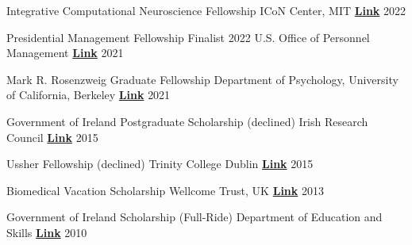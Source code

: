 

\begin{cvhonors}

 \cvhonor
    {Integrative Computational Neuroscience Fellowship} %
    {ICoN Center, MIT}
    {\href{https://yangtan.mit.edu/supported-researchers/}{\textbf{Link}}}
  	{2022}

 \cvhonor
    {Presidential Management Fellowship Finalist 2022} %
    {U.S. Office of Personnel Management}
    {\href{https://apply.pmf.gov/finalists.aspx}{\textbf{Link}}}
  	{2021}

 \cvhonor
    {Mark R. Rosenzweig Graduate Fellowship} %
    {Department of Psychology, University of California, Berkeley}
    {\href{https://psychology.berkeley.edu/give/endowed-funds}{\textbf{Link}}}
  	{2021}

 \cvhonor
   {Government of Ireland Postgraduate Scholarship (declined)}
   {Irish Research Council}
   {\href{https://research.ie/funding/goipg/}{\textbf{Link}}}
   {2015}
   
 \cvhonor
   {Ussher Fellowship (declined)}
   {Trinity College Dublin}
   {\href{https://www.tcd.ie/study/international/scholarships/Postgraduate/ussher.php}{\textbf{Link}}}
   {2015}

  \cvhonor
   {Biomedical Vacation Scholarship}
   {Wellcome Trust, UK}
   {\href{https://wellcome.org/}{\textbf{Link}}}
   {2013}

  \cvhonor
   {Government of Ireland Scholarship (Full-Ride)}
   {Department of Education and Skills}
   {\href{https://www.gov.ie/en/service/third-level-scholarships/}{\textbf{Link}}}
   {2010}
   
\end{cvhonors}


